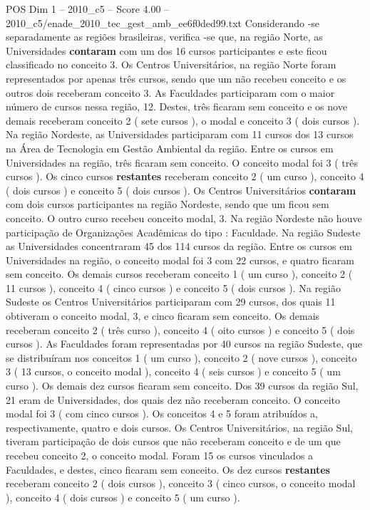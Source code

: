 \begin{textsample}{POS Dim 1 – 2010\_c5 – Score 4.00 – 2010\_c5/enade\_2010\_tec\_gest\_amb\_ee6f0ded99.txt}
Considerando -se separadamente as regiões brasileiras, verifica -se que, na região Norte, as Universidades \textbf{contaram} com um dos 16 cursos participantes e este ficou classificado no conceito 3.
Os Centros Universitários, na região Norte foram representados por apenas três cursos, sendo que um não recebeu conceito e os outros dois receberam conceito 3.
As Faculdades participaram com o maior número de cursos nessa região, 12.
Destes, três ficaram sem conceito e os nove demais receberam conceito 2 ( sete cursos ), o modal e conceito 3 ( dois cursos ).
Na região Nordeste, as Universidades participaram com 11 cursos dos 13 cursos na Área de Tecnologia em Gestão Ambiental da região.
Entre os cursos em Universidades na região, três ficaram sem conceito.
O conceito modal foi 3 ( três cursos ).
Os cinco cursos \textbf{restantes} receberam conceito 2 ( um curso ), conceito 4 ( dois cursos ) e conceito 5 ( dois cursos ).
Os Centros Universitários \textbf{contaram} com dois cursos participantes na região Nordeste, sendo que um ficou sem conceito.
O outro curso recebeu conceito modal, 3.
Na região Nordeste não houve participação de Organizações Acadêmicas do tipo : Faculdade.
Na região Sudeste as Universidades concentraram 45 dos 114 cursos da região.
Entre os cursos em Universidades na região, o conceito modal foi 3 com 22 cursos, e quatro ficaram sem conceito.
Os demais cursos receberam conceito 1 ( um curso ), conceito 2 ( 11 cursos ), conceito 4 ( cinco cursos ) e conceito 5 ( dois cursos ).
Na região Sudeste os Centros Universitários participaram com 29 cursos, dos quais 11 obtiveram o conceito modal, 3, e cinco ficaram sem conceito.
Os demais receberam conceito 2 ( três curso ), conceito 4 ( oito cursos ) e conceito 5 ( dois cursos ).
As Faculdades foram representadas por 40 cursos na região Sudeste, que se distribuíram nos conceitos 1 ( um curso ), conceito 2 ( nove cursos ), conceito 3 ( 13 cursos, o conceito modal ), conceito 4 ( seis cursos ) e conceito 5 ( um curso ).
Os demais dez cursos ficaram sem conceito.
Dos 39 cursos da região Sul, 21 eram de Universidades, dos quais dez não receberam conceito.
O conceito modal foi 3 ( com cinco cursos ).
Os conceitos 4 e 5 foram atribuídos a, respectivamente, quatro e dois cursos.
Os Centros Universitários, na região Sul, tiveram participação de dois cursos que não receberam conceito e de um que recebeu conceito 2, o conceito modal.
Foram 15 os cursos vinculados a Faculdades, e destes, cinco ficaram sem conceito.
Os dez cursos \textbf{restantes} receberam conceito 2 ( dois cursos ), conceito 3 ( cinco cursos, o conceito modal ), conceito 4 ( dois cursos ) e conceito 5 ( um curso ).

\end{textsample}
